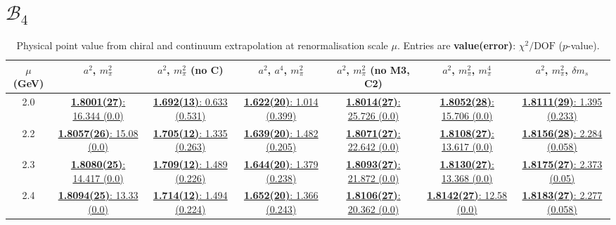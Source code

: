 \documentclass[12pt]{extarticle}
\begin{document}
\section{$\mathcal{B}_4$}
\begin{table}[h!]
\begin{center}
\begin{tabular}{|c|c|c|c|c|c|c|}
\hline
$\mu$ (GeV) & $a^2$, $m_\pi^2$& $a^2$, $m_\pi^2$ (no C)& $a^2$, $a^4$, $m_\pi^2$& $a^2$, $m_\pi^2$ (no M3, C2)& $a^2$, $m_\pi^2$, $m_\pi^4$& $a^2$, $m_\pi^2$, $\delta m_s$\\
\hline
2.0& \hyperlink{SSpPP/SUSY/a2m2_20.pdf.1}{\textbf{1.8001(27)}: 16.344 (0.0)} & \hyperlink{SSpPP/SUSY/a2m2noC_20.pdf.1}{\textbf{1.692(13)}: 0.633 (0.531)} & \hyperlink{SSpPP/SUSY/a2a4m2_20.pdf.1}{\textbf{1.622(20)}: 1.014 (0.399)} & \hyperlink{SSpPP/SUSY/a2m2mcut_20.pdf.1}{\textbf{1.8014(27)}: 25.726 (0.0)} & \hyperlink{SSpPP/SUSY/a2m2m4_20.pdf.1}{\textbf{1.8052(28)}: 15.706 (0.0)} & \hyperlink{SSpPP/SUSY/a2m2delm_20.pdf.1}{\textbf{1.8111(29)}: 1.395 (0.233)}\\
2.2& \hyperlink{SSpPP/SUSY/a2m2_22.pdf.1}{\textbf{1.8057(26)}: 15.08 (0.0)} & \hyperlink{SSpPP/SUSY/a2m2noC_22.pdf.1}{\textbf{1.705(12)}: 1.335 (0.263)} & \hyperlink{SSpPP/SUSY/a2a4m2_22.pdf.1}{\textbf{1.639(20)}: 1.482 (0.205)} & \hyperlink{SSpPP/SUSY/a2m2mcut_22.pdf.1}{\textbf{1.8071(27)}: 22.642 (0.0)} & \hyperlink{SSpPP/SUSY/a2m2m4_22.pdf.1}{\textbf{1.8108(27)}: 13.617 (0.0)} & \hyperlink{SSpPP/SUSY/a2m2delm_22.pdf.1}{\textbf{1.8156(28)}: 2.284 (0.058)}\\
2.3& \hyperlink{SSpPP/SUSY/a2m2_23.pdf.1}{\textbf{1.8080(25)}: 14.417 (0.0)} & \hyperlink{SSpPP/SUSY/a2m2noC_23.pdf.1}{\textbf{1.709(12)}: 1.489 (0.226)} & \hyperlink{SSpPP/SUSY/a2a4m2_23.pdf.1}{\textbf{1.644(20)}: 1.379 (0.238)} & \hyperlink{SSpPP/SUSY/a2m2mcut_23.pdf.1}{\textbf{1.8093(27)}: 21.872 (0.0)} & \hyperlink{SSpPP/SUSY/a2m2m4_23.pdf.1}{\textbf{1.8130(27)}: 13.368 (0.0)} & \hyperlink{SSpPP/SUSY/a2m2delm_23.pdf.1}{\textbf{1.8175(27)}: 2.373 (0.05)}\\
2.4& \hyperlink{SSpPP/SUSY/a2m2_24.pdf.1}{\textbf{1.8094(25)}: 13.33 (0.0)} & \hyperlink{SSpPP/SUSY/a2m2noC_24.pdf.1}{\textbf{1.714(12)}: 1.494 (0.224)} & \hyperlink{SSpPP/SUSY/a2a4m2_24.pdf.1}{\textbf{1.652(20)}: 1.366 (0.243)} & \hyperlink{SSpPP/SUSY/a2m2mcut_24.pdf.1}{\textbf{1.8106(27)}: 20.362 (0.0)} & \hyperlink{SSpPP/SUSY/a2m2m4_24.pdf.1}{\textbf{1.8142(27)}: 12.58 (0.0)} & \hyperlink{SSpPP/SUSY/a2m2delm_24.pdf.1}{\textbf{1.8183(27)}: 2.277 (0.058)}\\
\hline
\end{tabular}
\caption{Physical point value from chiral and continuum extrapolation at renormalisation scale $\mu$. Entries are \textbf{value(error)}: $\chi^2/\text{DOF}$ ($p$-value).}
\end{center}
\end{table}
\end{document}
